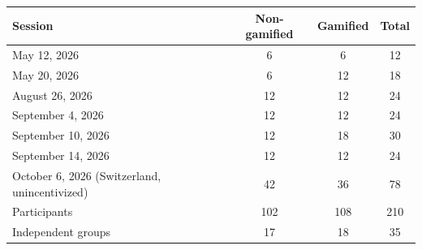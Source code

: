 \begin{tabular}{@{}lccc@{}}
\midrule \midrule
Session & Non-gamified & Gamified & Total \\
\midrule
May 12, 2026 & 6 & 6 & 12 \\
May 20, 2026 & 6 & 12 & 18 \\
August 26, 2026 & 12 & 12 & 24 \\
September 4, 2026 & 12 & 12 & 24 \\
September 10, 2026 & 12 & 18 & 30 \\
September 14, 2026 & 12 & 12 & 24 \\
October 6, 2026 (Switzerland, unincentivized) & 42 & 36 & 78 \\
\midrule
Participants & 102 & 108 & 210 \\
Independent groups & 17 & 18 & 35 \\
\midrule \midrule
\end{tabular}
